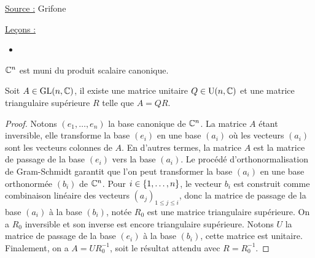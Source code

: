 
\newcommand{\gl}{\text{GL}(n,\Cx)}
\newcommand{\un}{\text{U}(n,\Cx)}

\pagestyle{fancy}

\fancyhead[C]{}
\fancyhead[R]{}



\underline{Source :} Grifone

\underline{Leçons :}
\begin{itemize}
\item 
\end{itemize}

\begin{nota}
$\mathbb{C}^n$ est muni du produit scalaire canonique.
\end{nota}

\begin{thm}
Soit $A \in \gl$, il existe une matrice unitaire $Q \in \un$ et une matrice triangulaire supérieure $R$ telle que $A = QR$.
\end{thm}

\begin{proof}
Notons $(e_1, \dots, e_n)$ la base canonique de $\mathbb{C}^n$.
La matrice $A$ étant inversible, elle transforme la base $(e_i)$ en une base $(a_i)$ où les vecteurs $(a_i)$ sont les vecteurs colonnes de $A$.
En d'autres termes, la matrice $A$ est la matrice de passage de la base $(e_i)$ vers la base $(a_i)$.
Le procédé d'orthonormalisation de Gram-Schmidt garantit que l'on peut transformer la base $(a_i)$ 
en une base orthonormée $(b_i)$ de $\mathbb{C}^n$.
Pour $i \in \{ 1, \dots, n \}$, le vecteur $b_i$ est construit comme combinaison linéaire des vecteurs $(a_j)_{1 \leq j \leq i}$, 
donc la matrice de passage de la base $(a_i)$ à la base $(b_i)$, notée $R_0$ est une matrice triangulaire supérieure.
On a $R_0$ inversible et son inverse est encore triangulaire supérieure.
Notons $U$ la matrice de passage de la base $(e_i)$ à la base $(b_i)$, cette matrice est unitaire.
Finalement, on a $A=U R_0^{-1}$, soit le résultat attendu avec $R=R_0^{-1}$.
\end{proof}


